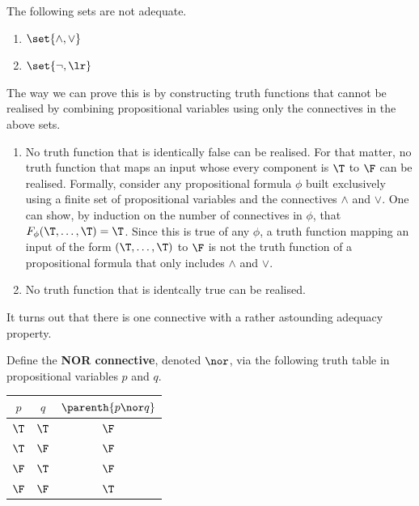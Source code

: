 \begin{boxnexample}
    The following sets are not adequate.
    \begin{enumerate}[label = (\roman*)]
        \item $\set{\land, \lor}$
        \item $\set{\neg, \lr}$
    \end{enumerate}
    The way we can prove this is by constructing truth functions that cannot be realised by combining propositional variables using only the connectives in the above sets.
    \begin{enumerate}[label = (\roman*)]
        \item No truth function that is identically false can be realised. For that matter, no truth function that maps an input whose every component is $\T$ to $\F$ can be realised. Formally, consider any propositional formula $\phi$ built exclusively using a finite set of propositional variables and the connectives $\land$ and $\lor$. One can show, by induction on the number of connectives in $\phi$, that $F_{\phi}(\T, \ldots, \T) = \T$. Since this is true of any $\phi$, a truth function mapping an input of the form $(\T, \ldots, \T)$ to $\F$ is not the truth function of a propositional formula that only includes $\land$ and $\lor$.
        
        \item No truth function that is identcally true can be realised.
    \end{enumerate}
\end{boxnexample}

It turns out that there is one connective with a rather astounding adequacy property.

\begin{boxdefinition}
    Define the \textbf{NOR connective}, denoted $\nor$, via the following truth table in propositional variables $p$ and $q$.
    \begin{table}[H]
        \centering
        \begin{tabular}{cc|c}
            $p$ & $q$ & $\parenth{p \nor q}$ \\ 
            \hline
            $\T$ & $\T$ & $\F$ \\
            $\T$ & $\F$ & $\F$ \\
            $\F$ & $\T$ & $\F$ \\
            $\F$ & $\F$ & $\T$
        \end{tabular}
    \end{table}
\end{boxdefinition}

